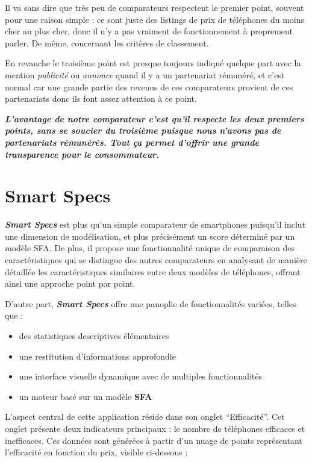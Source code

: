 \documentclass[
  12pt,
]{report}
\providecommand{\tightlist}{%
  \setlength{\itemsep}{0pt}\setlength{\parskip}{0pt}}\usepackage{longtable,booktabs,array}
\begin{document}
Il va sans dire que très peu de comparateurs respectent le premier
point, souvent pour une raison simple : ce sont juste des listings de
prix de téléphones du moins cher au plus cher, donc il n'y a pas
vraiment de fonctionnement à proprement parler. De même, concernant les
critères de classement.

En revanche le troisième point est presque toujours indiqué quelque part
avec la mention \emph{publicité} ou \emph{annonce} quand il y a un
partenariat rémunéré, et c'est normal car une grande partie des revenus
de ces comparateurs provient de ces partenariats donc ils font assez
attention à ce point.

\textbf{\emph{L'avantage de notre comparateur c'est qu'il respecte les
deux premiers points, sans se soucier du troisième puisque nous n'avons
pas de partenariats rémunérés. Tout ça permet d'offrir une grande
transparence pour le consommateur.}}

\section{Smart Specs}\label{smart-specs}

\textbf{\emph{Smart Specs}} est plus qu'un simple comparateur de
smartphones puisqu'il inclut une dimension de modélisation, et plus
précisément un score déterminé par un modèle SFA. De plus, il propose
une fonctionnalité unique de comparaison des caractéristiques qui se
distingue des autres comparateurs en analysant de manière détaillée les
caractéristiques similaires entre deux modèles de téléphones, offrant
ainsi une approche point par point.

D'autre part, \textbf{\emph{Smart Specs}} offre une panoplie de
fonctionnalités variées, telles que :

\begin{itemize}
\tightlist
\item
  des statistiques descriptives élémentaires
\item
  une restitution d'informations approfondie
\item
  une interface visuelle dynamique avec de multiples fonctionnalités
\item
  un moteur basé sur un modèle \textbf{SFA}
\end{itemize}

L'aspect central de cette application réside dans son onglet
``Efficacité''. Cet onglet présente deux indicateurs principaux : le
nombre de téléphones efficaces et inefficaces. Ces données sont générées
à partir d'un nuage de points représentant l'efficacité en fonction du
prix, visible ci-dessous :
\end{document}
